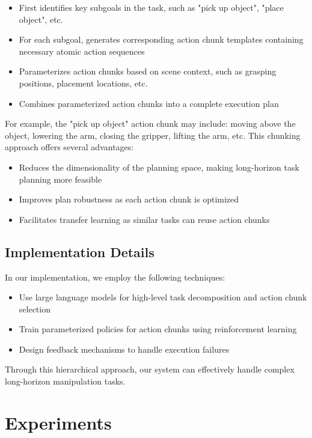 \documentclass{article}
\begin{document}
\begin{itemize}
    \item First identifies key subgoals in the task, such as "pick up object", "place object", etc.
    \item For each subgoal, generates corresponding action chunk templates containing necessary atomic action sequences
    \item Parameterizes action chunks based on scene context, such as grasping positions, placement locations, etc.
    \item Combines parameterized action chunks into a complete execution plan
\end{itemize}

For example, the "pick up object" action chunk may include: moving above the object, lowering the arm, closing the gripper, lifting the arm, etc. This chunking approach offers several advantages:

\begin{itemize}
    \item Reduces the dimensionality of the planning space, making long-horizon task planning more feasible
    \item Improves plan robustness as each action chunk is optimized
    \item Facilitates transfer learning as similar tasks can reuse action chunks
\end{itemize}

\subsection{Implementation Details}

In our implementation, we employ the following techniques:

\begin{itemize}
    \item Use large language models for high-level task decomposition and action chunk selection
    \item Train parameterized policies for action chunks using reinforcement learning
    \item Design feedback mechanisms to handle execution failures
\end{itemize}

Through this hierarchical approach, our system can effectively handle complex long-horizon manipulation tasks.

\section{Experiments}
\end{document}
